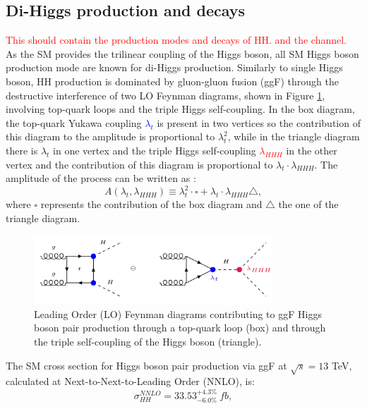 \subsection{Di-Higgs production and decays} 
\label{chap1:HH:HPD}
\textcolor{red}{This should contain the production modes and decays of HH. and the \HHyybb channel.
\\
}
As the SM provides the trilinear coupling of the Higgs boson, all SM Higgs boson production mode are known for di-Higgs production. Similarly to single Higgs boson, HH production is dominated by gluon-gluon fusion (ggF) through the destructive interference of two LO Feynman diagrams, shown in Figure \ref{fig:chap1:HH:HPD:FY}, involving top-quark loops and the triple Higgs self-coupling. In the box diagram, the top-quark Yukawa coupling \textcolor{blue}{$\lambda_t$} is present in two vertices so the contribution of this diagram to the amplitude is proportional to $\lambda_t^2$, while in the triangle diagram there is $\lambda_t$ in one vertex and the triple Higgs self-coupling \textcolor{red}{$\lambda_{HHH}$} in the other vertex and the contribution of this diagram is proportional to $\lambda_t\cdot\lambda_{HHH}$. The amplitude of the process can be written as :
\begin{equation}
    A(\lambda_t, \lambda_{HHH}) \equiv \lambda_t^2\cdot\square + \lambda_t\cdot\lambda_{HHH}\bigtriangleup,
\end{equation}
where $\square$ represents the contribution of the box diagram and $\bigtriangleup$ the one of the triangle diagram. 
\begin{figure}[H]
    \centering
    \includegraphics[width=0.8\textwidth]{Ch1/Img/HH_feyn.png}
    \caption{Leading Order (LO) Feynman diagrams contributing to ggF Higgs boson pair production through a top-quark loop (box) and through the triple self-coupling of the Higgs boson (triangle).}
    \label{fig:chap1:HH:HPD:FY}
\end{figure}
The SM cross section for Higgs boson pair production via ggF at $\sqrt{s}=13$ TeV, calculated at Next-to-Next-to-Leading Order (NNLO), is:
\begin{equation}
    \sigma_{HH}^{NNLO} = 33.53_{-6.0\%}^{+4.3\%} \ fb,
    \label{eq:chap1:HH:XSEC:NNL0}
\end{equation}
